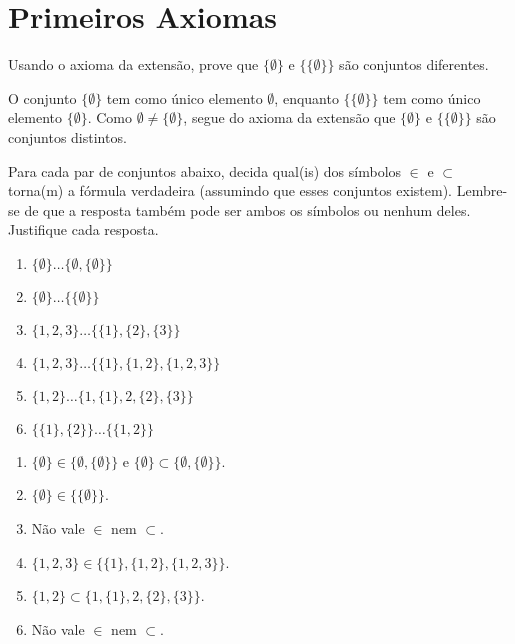 \chapter{Primeiros Axiomas}

\setcounter{ex}{0}

\begin{exercicio}
	Usando o axioma da extensão, prove que $\{\emptyset\}$ e $\{\{\emptyset\}\}$ são conjuntos diferentes.
\end{exercicio}
\begin{solucao}
	O conjunto $\{\emptyset\}$ tem como único elemento $\emptyset$, enquanto $\{\{\emptyset\}\}$ tem como único elemento $\{\emptyset\}$. Como $\emptyset\neq\{\emptyset\}$, segue do axioma da extensão que $\{\emptyset\}$ e $\{\{\emptyset\}\}$ são conjuntos distintos.
\end{solucao}

\begin{exercicio}
	Para cada par de conjuntos abaixo, decida qual(is) dos símbolos $\in$ e $\subset$ torna(m) a fórmula verdadeira (assumindo que esses conjuntos existem). Lembre-se de que a resposta também pode ser ambos os símbolos ou nenhum deles. Justifique cada resposta.
	\begin{enumerate}[label=(\alph{*})]
		\item $\{\emptyset\}\ldots\{\emptyset,\{\emptyset\}\}$
		\item $\{\emptyset\}\ldots\{\{\emptyset\}\}$
		\item $\{1,2,3\}\ldots\{\{1\},\{2\},\{3\}\}$
		\item $\{1,2,3\}\ldots\{\{1\},\{1,2\},\{1,2,3\}\}$
		\item $\{1,2\}\ldots\{1,\{1\},2,\{2\},\{3\}\}$
		\item $\{\{1\},\{2\}\}\ldots\{\{1,2\}\}$
	\end{enumerate}
\end{exercicio}

\begin{enumerate}[label=(\alph{*})]
	\item $\{\emptyset\}\in\{\emptyset,\{\emptyset\}\}$ e $\{\emptyset\}\subset\{\emptyset,\{\emptyset\}\}$.
	\item $\{\emptyset\}\in\{\{\emptyset\}\}$.
	\item Não vale $\in$ nem $\subset$.
	\item $\{1,2,3\}\in\{\{1\},\{1,2\},\{1,2,3\}\}$.
	\item $\{1,2\}\subset\{1,\{1\},2,\{2\},\{3\}\}$.
	\item Não vale $\in$ nem $\subset$.
\end{enumerate}


